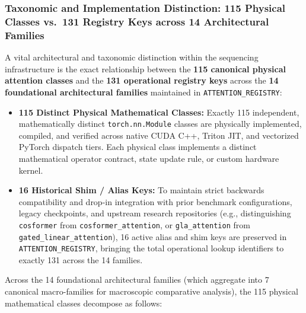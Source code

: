 \subsubsection{Taxonomic and Implementation Distinction: 115 Physical Classes vs.\ 131 Registry Keys across 14 Architectural Families}
\label{subsubsec:115_vs_131_distinction}
A vital architectural and taxonomic distinction within the \neuralops{} sequencing infrastructure is the exact relationship between the \textbf{115 canonical physical attention classes} and the \textbf{131 operational registry keys} across the \textbf{14 foundational architectural families} maintained in \texttt{ATTENTION\_REGISTRY}:
\begin{itemize}
    \item \textbf{115 Distinct Physical Mathematical Classes:} Exactly 115 independent, mathematically distinct \texttt{torch.nn.Module} classes are physically implemented, compiled, and verified across native CUDA C++, Triton JIT, and vectorized PyTorch dispatch tiers. Each physical class implements a distinct mathematical operator contract, state update rule, or custom hardware kernel.
    \item \textbf{16 Historical Shim / Alias Keys:} To maintain strict backwards compatibility and drop-in integration with prior benchmark configurations, legacy checkpoints, and upstream research repositories (e.g., distinguishing \texttt{cosformer} from \texttt{cosformer\_attention}, or \texttt{gla\_attention} from \texttt{gated\_linear\_attention}), 16 active alias and shim keys are preserved in \texttt{ATTENTION\_REGISTRY}, bringing the total operational lookup identifiers to exactly 131 across the 14 families.
\end{itemize}
Across the 14 foundational architectural families (which aggregate into 7 canonical macro-families for macroscopic comparative analysis), the 115 physical mathematical classes decompose as follows:
